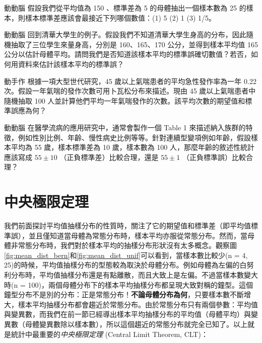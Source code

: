     \bigskip

    \begin{custom}{動動腦}
        假設我們從平均值為 150 、標準差為 5 的母體抽出一個樣本數為 25 的樣本，則樣本標準差應該會最接近下列哪個數值：(1) 5 (2) 1 (3) 1/5。
    \end{custom}

    \answerbox{110pt}

    \bigskip

    \begin{custom}{動動腦}
        回到清華大學生的例子。假設我們不知道清華大學生身高的分布，因此隨機抽取了三位學生來量身高，分別是 160、165、170 公分，並得到樣本平均值 165 公分以估計母體平均。請問我們是否知道該樣本平均的標準誤確切數值？若否，如何用資料來估計該樣本平均的標準誤？
    \end{custom}

    \answerbox{130pt}

    \bigskip

    \begin{custom}{動手作}
        根據一項大型世代研究，45 歲以上氣喘患者的平均急性發作率為一年 0.22 次。假設一年氣喘的發作次數可用卜瓦松分布來描述。現由 45 歲以上氣喘患者中隨機抽取 100 人並計算他們平均一年氣喘發作的次數。該平均次數的期望值和標準誤應為何？
    \end{custom}

    \answerbox{180pt}

    \bigskip

    \begin{custom}{動動腦}
        在醫學流病的應用研究中，通常會製作一個 Table 1 來描述納入族群的特徵，例如性別比例、年齡、慢性病史比例等等。針對連續型變項例如年齡，假設樣本平均為 55 歲，樣本標準差為 10 歲，樣本數為 100 人，那麼年齡的敘述性統計應該寫成 $55 \pm 10$ （正負標準差）比較合理，還是 $55 \pm 1$ （正負標準誤）比較合理？
    \end{custom}

    \answerbox{180pt}

\section{中央極限定理}
    我們前面探討平均值抽樣分布的性質時，關注了它的期望值和標準差（即平均值標準誤），並且僅知道當母體為常態分布時，樣本平均亦服從常態分布。然而，當母體非常態分布時，我們對於樣本平均的抽樣分布形狀沒有太多概念。觀察圖\ref{fig:mean_dist_bern}和\ref{fig:mean_dist_unif}可以看到，當樣本數比較少(n = 4, 25)的時候，平均值抽樣分布的型態較為取決於母體分布。例如母體為左偏的白努利分布時，平均值抽樣分布還是有點離散，而且大致上是左偏。不過當樣本數變大時(n = 100)，兩個母體分布下的樣本平均抽樣分布都呈現大致對稱的鐘型。這個鐘型分布不是別的分布：正是常態分布！\textbf{不論母體分布為何}，只要樣本數不斷增大，樣本平均抽樣分布都會趨近於常態分布。由於常態分布只有兩個參數：平均值與變異數，而我們在前一節已經導出樣本平均抽樣分布的平均值（母體平均）與變異數（母體變異數除以樣本數），所以這個趨近的常態分布就完全已知了。以上就是統計中最重要的\textit{中央極限定理} (Central Limit Theorem, CLT)：

